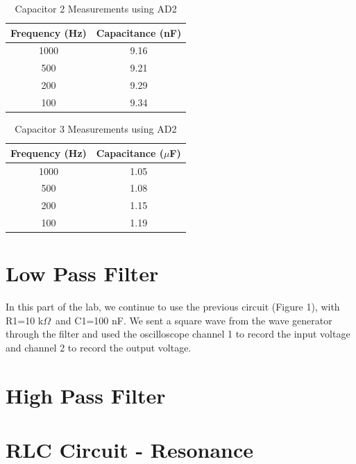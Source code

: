 \documentclass{article}
\renewcommand{\O}{\(\Omega\)}
\begin{document}
\begin{table}[H]
    \centering
    \begin{tabular}{c|c}
        Frequency (Hz) & Capacitance (nF)\\
        \hline
        1000 & 9.16\\
        500 & 9.21\\
        200 & 9.29\\
        100 & 9.34
    \end{tabular}
    \caption{Capacitor 2 Measurements using AD2}
\end{table}

\begin{table}[H]
    \centering
    \begin{tabular}{c|c}
        Frequency (Hz) & Capacitance (\(\mu\)F)\\
        \hline
        1000 & 1.05\\
        500 & 1.08\\
        200 & 1.15\\
        100 & 1.19
    \end{tabular}
    \caption{Capacitor 3 Measurements using AD2}
\end{table}

\section{Low Pass Filter}
In this part of the lab, we continue to use the previous circuit (Figure 1), with R1=10 k\O\ and C1=100 nF. We sent a square wave from the wave generator through the filter and used the oscilloscope channel 1 to record the input voltage and channel 2 to record the output voltage. 

\section{High Pass Filter}


\section{RLC Circuit - Resonance}
\end{document}
